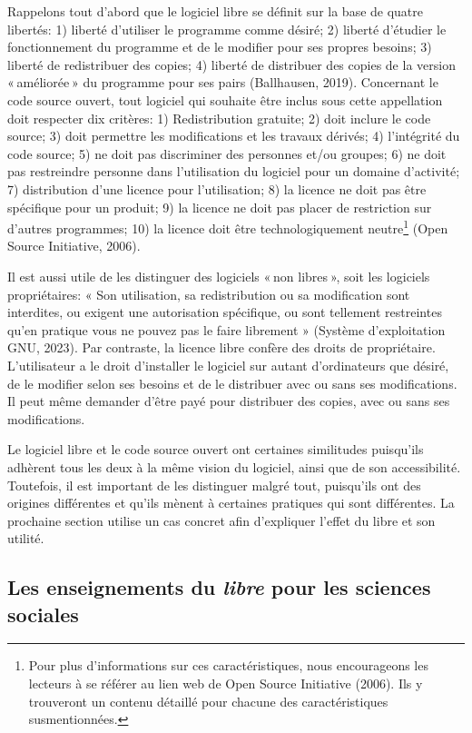 \documentclass[
  letterpaper,
  DIV=11,
  numbers=noendperiod,
  oneside]{scrreprt}
\begin{document}
Rappelons tout d'abord que le logiciel libre se définit sur la base de
quatre libertés: 1) liberté d'utiliser le programme comme désiré; 2)
liberté d'étudier le fonctionnement du programme et de le modifier pour
ses propres besoins; 3) liberté de redistribuer des copies; 4) liberté
de distribuer des copies de la version « améliorée » du programme pour
ses pairs (Ballhausen, 2019). Concernant le code source ouvert, tout
logiciel qui souhaite être inclus sous cette appellation doit respecter
dix critères: 1) Redistribution gratuite; 2) doit inclure le code
source; 3) doit permettre les modifications et les travaux dérivés; 4)
l'intégrité du code source; 5) ne doit pas discriminer des personnes
et/ou groupes; 6) ne doit pas restreindre personne dans l'utilisation du
logiciel pour un domaine d'activité; 7) distribution d'une licence pour
l'utilisation; 8) la licence ne doit pas être spécifique pour un
produit; 9) la licence ne doit pas placer de restriction sur d'autres
programmes; 10) la licence doit être technologiquement neutre\footnote{Pour
  plus d'informations sur ces caractéristiques, nous encourageons les
  lecteurs à se référer au lien web de Open Source Initiative (2006).
  Ils y trouveront un contenu détaillé pour chacune des caractéristiques
  susmentionnées.} (Open Source Initiative, 2006).

Il est aussi utile de les distinguer des logiciels « non libres », soit
les logiciels propriétaires: « Son utilisation, sa redistribution ou sa
modification sont interdites, ou exigent une autorisation spécifique, ou
sont tellement restreintes qu'en pratique vous ne pouvez pas le faire
librement » (Système d'exploitation GNU, 2023). Par contraste, la
licence libre confère des droits de propriétaire. L'utilisateur a le
droit d'installer le logiciel sur autant d'ordinateurs que désiré, de le
modifier selon ses besoins et de le distribuer avec ou sans ses
modifications. Il peut même demander d'être payé pour distribuer des
copies, avec ou sans ses modifications.

Le logiciel libre et le code source ouvert ont certaines similitudes
puisqu'ils adhèrent tous les deux à la même vision du logiciel, ainsi
que de son accessibilité. Toutefois, il est important de les distinguer
malgré tout, puisqu'ils ont des origines différentes et qu'ils mènent à
certaines pratiques qui sont différentes. La prochaine section utilise
un cas concret afin d'expliquer l'effet du libre et son utilité.

\hypertarget{les-enseignements-du-libre-pour-les-sciences-sociales}{%
\subsection{\texorpdfstring{Les enseignements du \emph{libre} pour les
sciences
sociales}{Les enseignements du libre pour les sciences sociales}}\label{les-enseignements-du-libre-pour-les-sciences-sociales}}
\end{document}
